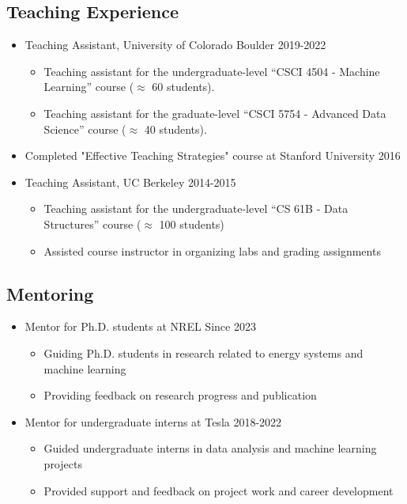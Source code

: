 \documentclass[a4paper,11pt]{article}
\begin{document}
\subsection{Teaching Experience}
\begin{itemize}[leftmargin=0.7cm,itemsep=0cm]
\item
Teaching Assistant, University of Colorado Boulder \hfill 2019-2022
\begin{itemize}[leftmargin=0.7cm,itemsep=0cm]
\item 
Teaching assistant for the undergraduate-level ``CSCI 4504 - Machine Learning'' course ($\approx$ 60 students).

\item 
Teaching assistant for the graduate-level ``CSCI 5754 - Advanced Data Science'' course ($\approx$ 40 students).
\end{itemize}

\item Completed "Effective Teaching Strategies" course at Stanford University \hfill 2016

\item Teaching Assistant, UC Berkeley \hfill 2014-2015
\begin{itemize}
    \item Teaching assistant for the undergraduate-level ``CS 61B - Data Structures'' course ($\approx$ 100 students)
    \item Assisted course instructor in organizing labs and grading assignments
\end{itemize}
\end{itemize}

\subsection{Mentoring}
\begin{itemize}[leftmargin=0.7cm,itemsep=0cm]
\item
Mentor for Ph.D. students at NREL \hfill Since 2023
\begin{itemize}[leftmargin=0.7cm,itemsep=0cm]
\item
Guiding Ph.D. students in research related to energy systems and machine learning
\item
Providing feedback on research progress and publication
\end{itemize}

\item
Mentor for undergraduate interns at Tesla \hfill 2018-2022
\begin{itemize}[leftmargin=0.7cm,itemsep=0cm]
\item
Guided undergraduate interns in data analysis and machine learning projects
\item
Provided support and feedback on project work and career development
\end{itemize}
\end{itemize}
\end{document}
